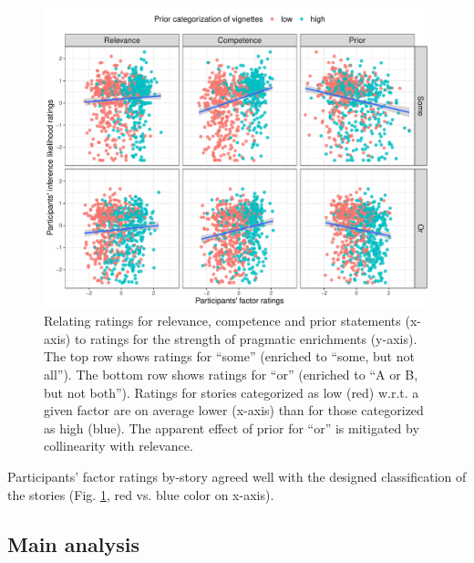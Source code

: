 \documentclass{sp}
\begin{document}
\begin{figure}[h]
	\begin{center}
		\includegraphics[width=1\linewidth]{images/byFactor-byPrior-raw-scatter.pdf}
	\end{center}
	\vspace{-0.3cm}
	\caption{Relating ratings for relevance, competence and prior statements (x-axis) to ratings for the strength of pragmatic enrichments (y-axis). The top row shows ratings for “some” (enriched to “some, but not all”). The bottom row shows ratings for “or” (enriched to “A or
B, but not both”). Ratings for stories categorized as low (red) w.r.t. a given factor are on average lower (x-axis) than for those categorized as high (blue). The apparent effect of prior for
“or” is mitigated by collinearity with relevance.}
	\label{main-raw-ratings}
\end{figure}

Participants’ factor ratings by-story agreed well with the designed classification of the stories (Fig. \ref{main-raw-ratings}, red vs. blue color on x-axis). 

\subsection{Main analysis}
\end{document}
